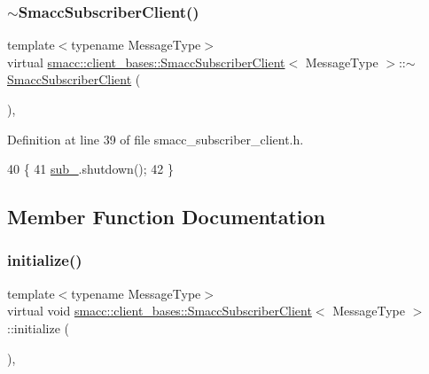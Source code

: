 \subsubsection{\texorpdfstring{$\sim$\+Smacc\+Subscriber\+Client()}{~SmaccSubscriberClient()}}
{\footnotesize\ttfamily template$<$typename Message\+Type$>$ \\
virtual \hyperlink{classsmacc_1_1client__bases_1_1SmaccSubscriberClient}{smacc\+::client\+\_\+bases\+::\+Smacc\+Subscriber\+Client}$<$ Message\+Type $>$\+::$\sim$\hyperlink{classsmacc_1_1client__bases_1_1SmaccSubscriberClient}{Smacc\+Subscriber\+Client} (\begin{DoxyParamCaption}{ }\end{DoxyParamCaption})\hspace{0.3cm}{\ttfamily [inline]}, {\ttfamily [virtual]}}



Definition at line 39 of file smacc\+\_\+subscriber\+\_\+client.\+h.


\begin{DoxyCode}
40   \{
41     \hyperlink{classsmacc_1_1client__bases_1_1SmaccSubscriberClient_a0f69a1b0a284ae47f5d717c6ab95f089}{sub\_}.shutdown();
42   \}
\end{DoxyCode}


\subsection{Member Function Documentation}
\mbox{\label{classsmacc_1_1client__bases_1_1SmaccSubscriberClient_af188f0f5e89de26a07e1f964cdd23a70}} 
\subsubsection{\texorpdfstring{initialize()}{initialize()}}
{\footnotesize\ttfamily template$<$typename Message\+Type$>$ \\
virtual void \hyperlink{classsmacc_1_1client__bases_1_1SmaccSubscriberClient}{smacc\+::client\+\_\+bases\+::\+Smacc\+Subscriber\+Client}$<$ Message\+Type $>$\+::initialize (\begin{DoxyParamCaption}{ }\end{DoxyParamCaption})\hspace{0.3cm}{\ttfamily [inline]}, {\ttfamily [virtual]}}



